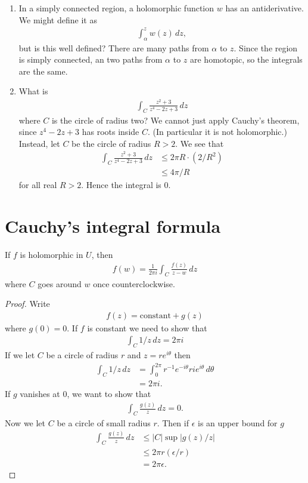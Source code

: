 \documentclass[11pt, oneside,margin=1in]{article}
\begin{document}
\begin{enumerate}
	\item In a simply connected region, a holomorphic function $w$ has an antiderivative. We might define it as
		\begin{align*}
			\int_{\alpha}^{z} w(z)  \, dz, 
		\end{align*}
		but is this well defined? There are many paths from $\alpha$ to $z$. Since the region is simply connected, an two paths from $\alpha$ to $z$ are homotopic, so the integrals are the same. 
	\item What is 
		\begin{align*}
			\int_{C}^{} \frac{z^2+3}{z^4-2z+3}  \, dz 
		\end{align*}
		where $C$ is the circle of radius two? We cannot just apply Cauchy's theorem, since $z^4-2z+3$ has roots inside $C$. (In particular it is not holomorphic.) Instead, let $C$ be the circle of radius $R>2$. We see that
		\begin{align*}
			\int_{C}^{} \frac{z^2 + 3}{z^4-2z+3}  \, dz &\le 2\pi R \cdot (2/R^2) \\
								    &\le 4\pi/R
		\end{align*}
		for all real $R>2$. Hence the integral is $0$.
\end{enumerate}
\section{Cauchy's integral formula}
If $f$ is holomorphic in $U$, then 
\begin{align*}
	f(w)=  \frac{1}{2\pi i} \int_{C}^{} \frac{f(z)}{z-w}  \, dz 
\end{align*}
where $C$ goes around $w$ once counterclockwise. 
\begin{proof}
Write
\begin{align*}
	f(z) = \textrm{constant} + g (z)
\end{align*}
where $g(0)=0$. If $f$ is constant we need to show that
\begin{align*}
	\int_{C}^{} 1/z  \, dz = 2\pi i 
\end{align*}
If we let $C$ be a circle of radius $r$ and $z=re^{i\theta}$ then
\begin{align*}
	\int_{C}^{} 1/z  \, dz &= \int_{0}^{2\pi} r^{-1}e^{-i\theta} r ie^{i\theta}  \, d\theta\\
			       &= 2\pi i.
\end{align*}
If $g$ vanishes at $0$, we want to show that 
\begin{align*}
	\int_{C}^{} \frac{g(z)}{z}  \, dz = 0. 
\end{align*}
Now we let $C$ be a circle of small radius $r$. Then if $\epsilon$ is an upper bound for $g$
\begin{align*}
	\int_{C}^{} \frac{g(z)}{z}  \, dz & \le \left\lvert C \right\rvert \sup \left\lvert g(z)/z \right\rvert \\
					  &\le 2\pi r (\epsilon/r) \\
					  &=2\pi \epsilon.
\end{align*}
\end{proof}
\end{document}
